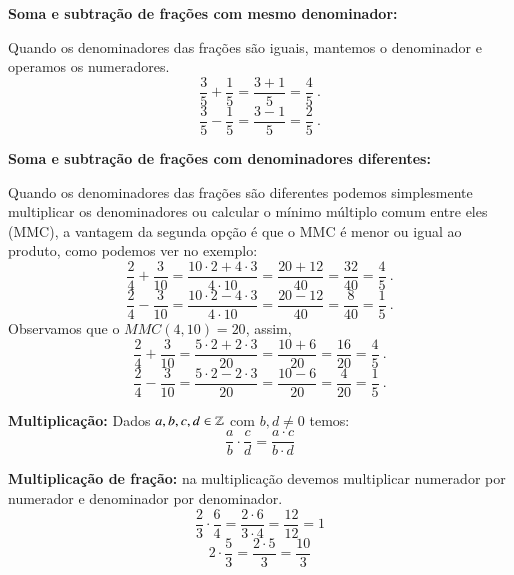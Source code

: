  \vskip0.3cm

 \begin{exem}
  \textbf{Soma e subtração de frações com mesmo denominador:}

   Quando os denominadores das frações são iguais, mantemos o denominador e operamos os numeradores.
    \vskip0.3cm
   \[\frac{3}{5} + \frac{1}{5}= \frac{3+1}{5}= \frac{4}{5} \ .\]
    \vskip0.3cm
   \[\frac{3}{5} - \frac{1}{5}= \frac{3-1}{5}= \frac{2}{5} \ .\]
 \end{exem}

 \begin{exem}
 \textbf{Soma e subtração de frações com denominadores diferentes:}

   Quando os denominadores das frações são diferentes podemos simplesmente multiplicar os denominadores ou calcular o mínimo múltiplo comum entre eles (MMC), a vantagem da segunda opção é que o MMC é menor ou igual ao produto, como podemos ver no exemplo:
    \vskip0.3cm
   \[\frac{2}{4} + \frac{3}{10}= \frac{10 \cdot 2 + 4 \cdot 3}{4 \cdot 10}= \frac{20 + 12}{40}= \frac{32}{40}= \frac{4}{5} \ .\]
    \vskip0.3cm
   \[\frac{2}{4} - \frac{3}{10}= \frac{10 \cdot 2 - 4 \cdot 3}{4 \cdot 10}= \frac{20 - 12}{40}= \frac{8}{40}= \frac{1}{5} \ .\]
    \vskip0.3cm
   Observamos que o $MMC(4, 10)= 20$, assim,
    \vskip0.3cm
   \[\frac{2}{4} + \frac{3}{10}= \frac{5 \cdot 2 + 2 \cdot 3}{20}= \frac{10+6}{20}= \frac{16}{20}=\frac{4}{5} \ .\]
    \vskip0.3cm
   \[\frac{2}{4} - \frac{3}{10}= \frac{5 \cdot 2 - 2 \cdot 3}{20}= \frac{10 - 6}{20}= \frac{4}{20}=\frac{1}{5} \ .\]
 \end{exem}


 \vskip0.5cm

 \colorbox{azul}{
 \begin{minipage}{0.9\linewidth}
 \begin{center}
  \textbf{Multiplicação:} Dados $a, b, c, d \in \mathbb{Z}$ com $b, d \neq 0$ temos:
 \[\frac{a}{b} \cdot \frac{c}{d}= \frac{a \cdot c}{b \cdot d} \]
 \end{center}
 \end{minipage}}

 \vskip0.3cm
 \begin{exem}
  \textbf{Multiplicação de fração:} na multiplicação devemos multiplicar numerador por numerador e denominador por denominador.
   \[\frac{2}{3} \cdot \frac{6}{4}= \frac{2 \cdot 6}{3 \cdot 4}= \frac{12}{12}= 1 \]
   \[2 \cdot \frac{5}{3}= \frac{2 \cdot 5}{3}= \frac{10}{3}\]
 \end{exem}


